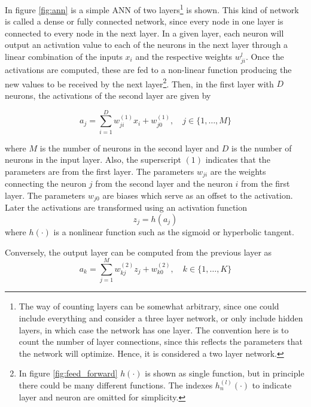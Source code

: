 In figure \ref{fig:ann} is a simple ANN of two layers\footnote{The way of counting layers can be somewhat arbitrary, since one could include everything and consider a three layer network, or only include hidden layers, in which case the network has one layer. The convention here is to count the number of layer connections, since this reflects the parameters that the network will optimize. Hence, it is considered a two layer network.} is shown. This kind of network is called a dense or fully connected network, since every node in one layer is connected to every node in the next layer. In a given layer, each neuron will output an activation value to each of the neurons in the next layer through a linear combination of the inputs $x_i$ and the respective weights $w^l_{ji}$. Once the activations are computed, these are fed to a non-linear function producing the new values to be received by the next layer\footnote{In figure \ref{fig:feed_forward} $h(\cdot)$ is shown as single function, but in principle there could be many different functions. The indexes $h^{(l)}_n(\cdot)$ to indicate layer and neuron are omitted for simplicity.}. Then, in the first layer with $D$ neurons, the activations of the second layer are given by

\begin{equation*}
    a_j = \sum^D_{i=1}w^{(1)}_{ji}x_i+w^{(1)}_{j0}, \quad j \in \{1,\ldots, M\}
\end{equation*}

where $M$ is the number of neurons in the second layer and $D$ is the number of neurons in the input layer. Also, the superscript $(1)$ indicates that the parameters are from the first layer. The parameters $w_{ji}$ are the weights connecting the neuron $j$ from the second layer and the neuron $i$ from the first layer. The parameters $w_{j0}$ are biases which serve as an offset to the activation. Later the activations are transformed using an activation function
\begin{equation*}
    z_j = h(a_j)
\end{equation*}
where $h(\cdot)$ is a nonlinear function such as the sigmoid or hyperbolic tangent.

Conversely, the output layer can be computed from the previous layer as
\begin{equation*}
    a_k = \sum^M_{j=1}w^{(2)}_{kj}z_j+w^{(2)}_{k0}, \quad k \in \{1,\ldots, K\}
\end{equation*}


